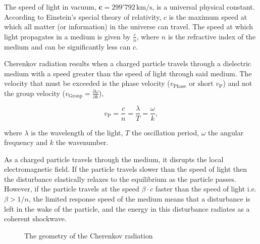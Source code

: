 \documentclass[11pt]{scrreprt}
\begin{document}
The speed of light in vacuum, \( \mathbf{c} = 299'792\,\text{km/s} \), is a universal physical constant. According to Einstein's special theory of relativity, 
\( c \) is the maximum speed at which all matter (or information) in the universe can travel. The speed at which light propagates in a 
medium is given by $\frac{c}{n}$, where $n$ is the refractive index of the medium and can be significantly less can \( c \).

Cherenkov radiation results when a charged particle travels through a dielectric medium with a speed greater than the speed of light 
through said medium. The velocity that must be exceeded is the phase velocity (\( v_{\text{Phase}} \text{ or short } v_{\text{P}} \)) 
and not the group velocity (\( v_{\text{Group}} = \frac{\partial \omega}{\partial k} \)),

\[ v_{\text{P}} = \frac{c}{n} = \frac{\lambda}{T}  =  \frac{\omega}{k},\]

where $\lambda$ is the wavelength of the light, $T$ the oscillation period, $\omega$ the angular frequency and $k$ the wavenumber.

As a charged particle travels through the medium, it disrupts the local electromagnetic field. If the particle travels slower than
the speed of light then the disturbance elastically relaxes to the equilibrium as the particle passes. However, if the particle 
travels at the speed $\beta\cdot c$ faster than the speed of light i.e. $\beta > 1/n$, the limited response speed of the medium means that a disturbance is left in the wake of the 
particle, and the energy in this disturbance radiates as a coherent shockwave.

\begin{figure}[htbp]
  \centering
  \caption{The geometry of the Cherenkov radiation}
  \label{fig:cherenkov_radiation}
\end{figure}
\end{document}
